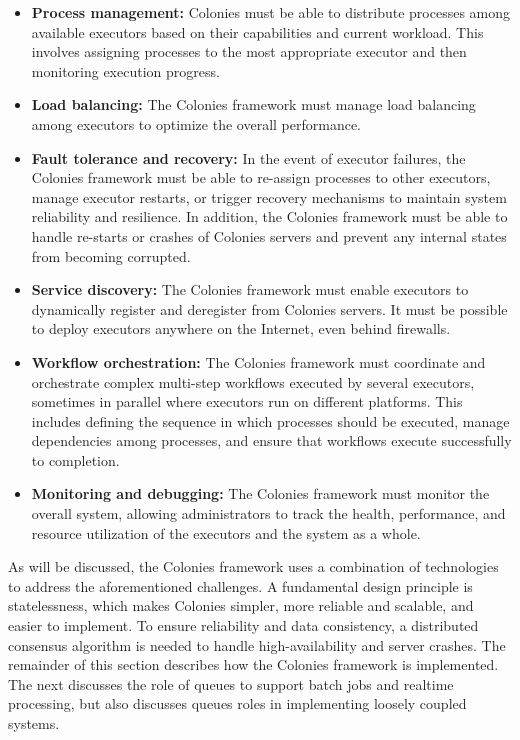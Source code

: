 \documentclass{article}
\begin{document}
\begin{itemize}
\item \textbf{Process management:} Colonies must be able to distribute processes among available executors based on their capabilities and current workload. This involves assigning processes to the most appropriate executor and then monitoring execution progress.

\item \textbf{Load balancing:} The Colonies framework must manage load balancing among executors to optimize the overall performance.

\item \textbf{Fault tolerance and recovery:} In the event of executor failures, the Colonies framework must be able to re-assign processes to other executors, manage executor restarts, or trigger recovery mechanisms to maintain system reliability and resilience. In addition, the Colonies framework must be able to handle re-starts or crashes of Colonies servers and prevent any internal states from becoming corrupted. 

\item \textbf{Service discovery:} The Colonies framework must enable executors to dynamically register and deregister from Colonies servers. It must be possible to deploy executors anywhere on the Internet, even behind firewalls.

\item \textbf{Workflow orchestration:} The Colonies framework must coordinate and orchestrate complex multi-step workflows executed by several executors, sometimes in parallel where executors run on different platforms. This includes defining the sequence in which processes should be executed, manage dependencies among processes, and ensure that workflows execute successfully to completion.

\item \textbf{Monitoring and debugging:} The Colonies framework must monitor the overall system, allowing administrators to track the health, performance, and resource utilization of the executors and the system as a whole.
\end{itemize}

As will be discussed, the Colonies framework uses a combination of technologies to address the aforementioned challenges. A fundamental design principle is statelessness, which makes Colonies simpler, more reliable and scalable, and easier to implement. To ensure reliability and data consistency, a distributed consensus algorithm is needed to handle high-availability and server crashes. The remainder of this section describes how the Colonies framework is implemented. The next discusses the role of queues to support batch jobs and realtime processing, but also discusses queues roles in implementing loosely coupled systems.
\end{document}
